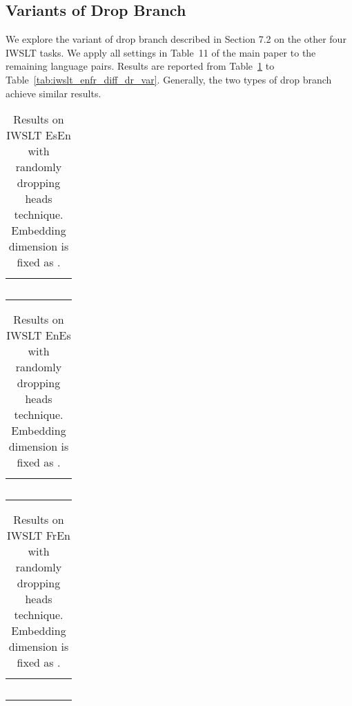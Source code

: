 \documentclass{article}
\begin{document}
\subsection{Variants of Drop Branch}
We explore the variant of drop branch described in Section 7.2 on the other four IWSLT tasks. We apply all settings in Table~11 of the main paper to the remaining language pairs. Results are reported from Table~\ref{tab:iwslt_esen_diff_dr_var} to Table~\ref{tab:iwslt_enfr_diff_dr_var}. Generally, the two types of drop branch achieve similar results. 


\begin{table}[!htbp]
\centering
\caption{Results on IWSLT EsEn with randomly dropping heads technique. Embedding dimension  is fixed as .}
\begin{tabular}{lccccc}
\toprule
		 &   &  &  &  &  \\
\midrule
		 &  &  &  &	 &  \\
		 &  &  &  &	 &  \\
		 &  &  &  &	 &  \\
		 &  &  &  &	 &  \\
		 &  &  &  &	 &  \\
\bottomrule
\end{tabular}
\label{tab:iwslt_esen_diff_dr_var}
\end{table}


\begin{table}[!htbp]
\centering
\caption{Results on IWSLT EnEs with randomly dropping heads technique. Embedding dimension  is fixed as .}
\begin{tabular}{lccccc}
\toprule
		 &   &  &  &  &  \\
\midrule
		 &  &  &  &	 &  \\
		 &  &  &  &	 &  \\
		 &  &  &  &	 &  \\
		 &  &  &  &	 &  \\
		 &  &  &  &	 &  \\
\bottomrule
\end{tabular}
\label{tab:iwslt_enes_diff_dr_var}
\end{table}


\begin{table}[!htbp]
\centering
\caption{Results on IWSLT FrEn with randomly dropping heads technique. Embedding dimension  is fixed as .}
\begin{tabular}{lccccc}
\toprule
		 &   &  &  &  &  \\
\midrule
		 &  &  &  &	 &  \\
		 &  &  &  &	 &  \\
		 &  &  &  &	 &  \\
		 &  &  &  &	 &  \\
		 &  &  &  &	 &  \\
\bottomrule
\end{tabular}
\label{tab:iwslt_fren_diff_dr_var}
\end{table}
\end{document}
